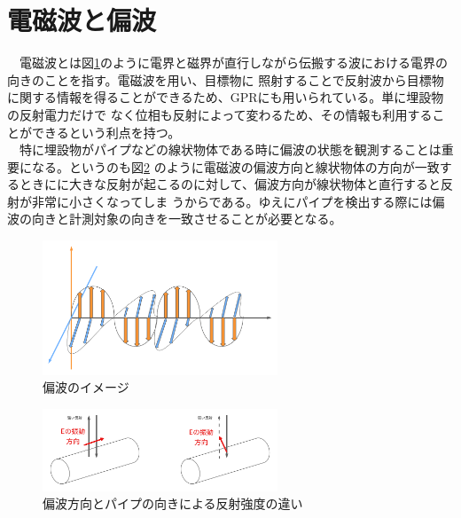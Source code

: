 \documentclass[a4paper,12pt]{jsreport}
\begin{document}
\section{電磁波と偏波}
　電磁波とは図\ref{偏波のイメージ}のように電界と磁界が直行しながら伝搬する波における電界の向きのことを指す。電磁波を用い、目標物に
照射することで反射波から目標物に関する情報を得ることができるため、GPRにも用いられている。単に埋設物の反射電力だけで
なく位相も反射によって変わるため、その情報も利用することができるという利点を持つ。
\\　特に埋設物がパイプなどの線状物体である時に偏波の状態を観測することは重要になる。というのも図\ref{偏波方向とパイプの向きによる反射強度の違い}
のように電磁波の偏波方向と線状物体の方向が一致するときにに大きな反射が起こるのに対して、偏波方向が線状物体と直行すると反射が非常に小さくなってしま
うからである。ゆえにパイプを検出する際には偏波の向きと計測対象の向きを一致させることが必要となる。
\begin{figure}[h]
  \begin{center}
   \includegraphics[width=7cm]{./image/wave_propagation.pdf}
  \caption{偏波のイメージ}\label{偏波のイメージ}
  \end{center}
  \end{figure}

  \begin{figure}[h]
    \begin{center}
     \includegraphics[width=7cm]{./image/polarization.pdf}
    \caption{偏波方向とパイプの向きによる反射強度の違い}\label{偏波方向とパイプの向きによる反射強度の違い}
    \end{center}
    \end{figure}
\end{document}
